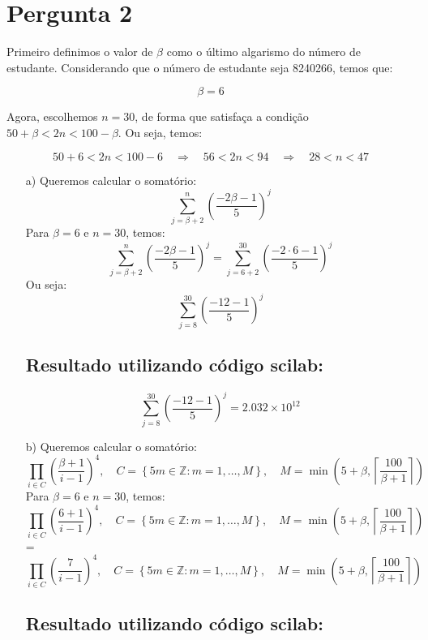 \chapter{Pergunta 2}

Primeiro definimos o valor de $\beta$ como o último algarismo do número de estudante. Considerando que o número de estudante seja 8240266, temos que:

\[
\beta = 6
\]

Agora, escolhemos $n = 30$, de forma que satisfaça a condição $50 + \beta < 2n < 100 - \beta$. Ou seja, temos:

\[
50 + 6 < 2n < 100 - 6 \quad \Rightarrow \quad 56 < 2n < 94 \quad \Rightarrow \quad 28 < n < 47
\]



\begin{enumerate}


    \item[a)]
    Queremos calcular o somatório:
    \[
    \sum_{j=\beta+2}^{n} \left( \frac{-2\beta-1}{5} \right)^j
    \]
    Para \(\beta = 6\) e \(n = 30\), temos:
    \[
    \sum_{j= \beta+2}^{n} \left( \frac{-2\beta-1}{5} \right)^j = \sum_{j= 6+2}^{30} \left( \frac{-2 \cdot 6 - 1}{5} \right)^j
    \]
    Ou seja:
    \[
    \sum_{j= 8}^{30} \left( \frac{-12 - 1}{5} \right)^j
    \]


\section*{Resultado utilizando  código scilab:}
     \[
    \sum_{j= 8}^{30} \left( \frac{-12 - 1}{5} \right)^j = 2.032 \times 10^{12}
    \]


   \item[b)]
   Queremos calcular o somatório:
   \[
\prod_{i \in C} \left( \frac{\beta + 1}{i - 1} \right)^4, \quad C = \left\{ 5m \in \mathbb{Z}: m = 1, \dots, M \right\}, \quad M = \min \left( 5 + \beta, \left\lceil \frac{100}{\beta + 1} \right\rceil \right)
\]
    Para \(\beta = 6\) e \(n = 30\), temos:
     \[
\prod_{i \in C} \left( \frac{6 + 1}{i - 1} \right)^4, \quad C = \left\{ 5m \in \mathbb{Z}: m = 1, \dots, M \right\}, \quad M = \min \left( 5 + \beta, \left\lceil \frac{100}{\beta + 1} \right\rceil \right) 
\]
 = \[
\prod_{i \in C} \left( \frac{7}{i - 1} \right)^4, \quad C = \left\{ 5m \in \mathbb{Z}: m = 1, \dots, M \right\}, \quad M = \min \left( 5 + \beta, \left\lceil \frac{100}{\beta + 1} \right\rceil \right) 
\]

\section*{Resultado utilizando  código scilab:}


\end{enumerate}
